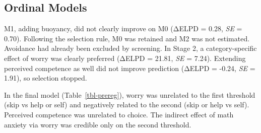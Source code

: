 \documentclass[
  man,
  floatsintext,
  longtable,
  nolmodern,
  notxfonts,
  notimes,
  colorlinks=true,linkcolor=blue,citecolor=blue,urlcolor=blue]{apa7}
\begin{document}
\subsection{Ordinal Models}\label{ordinal-models-1}

M1, adding buoyancy, did not clearly improve on M0 (ΔELPD = 0.28,
\emph{SE} = 0.70). Following the selection rule, M0 was retained and M2
was not estimated. Avoidance had already been excluded by screening. In
Stage 2, a category-specific effect of worry was clearly preferred
(ΔELPD = 21.81, \emph{SE} = 7.24). Extending perceived competence as
well did not improve prediction (ΔELPD = -0.24, \emph{SE} = 1.91), so
selection stopped.

In the final model (Table~\ref{tbl-prereg}), worry was unrelated to the
first threshold (skip vs help or self) and negatively related to the
second (skip or help vs self). Perceived competence was unrelated to
choice. The indirect effect of math anxiety via worry was credible only
on the second threshold.
\end{document}
